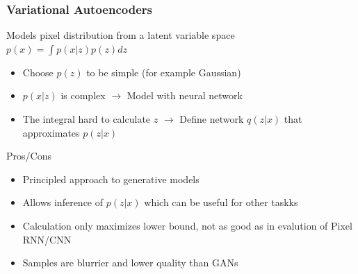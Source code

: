 \begin{minipage}{0.8\textwidth}
    \subsubsection{Variational Autoencoders}
    Models pixel distribution from a latent variable space $p(x)=\int p(x|z)p(z)dz$
    \begin{itemize}
        \item Choose $p(z)$ to be simple (for example Gaussian)
        \item $p(x|z)$ is complex $\rightarrow$ Model with neural network
        \item The integral hard to calculate $z$ $\rightarrow$ Define network $q(z|x)$ that approximates $p(z|x)$
    \end{itemize}
    Pros/Cons
    \begin{itemize}
        \item Principled approach to generative models
        \item Allows inference of $p(z|x)$ which can be useful for other taskks
        \item Calculation only maximizes lower bound, not as good as in evalution of Pixel RNN/CNN
        \item Samples are blurrier and lower quality than GANs
    \end{itemize}
\end{minipage}
